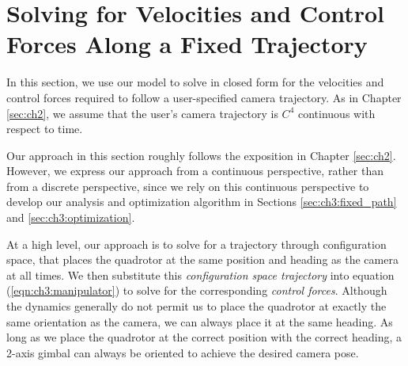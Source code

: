 \section{Solving for Velocities and Control Forces Along a Fixed Trajectory}
\label{sec:ch3:fixed_trajectory}

In this section, we use our model to solve in closed form for the velocities and control forces required to follow a user-specified camera trajectory.
As in Chapter \ref{sec:ch2}, we assume that the user's camera trajectory is $C^4$ continuous with respect to time.

Our approach in this section roughly follows the exposition in Chapter \ref{sec:ch2}.
However, we express our approach from a continuous perspective, rather than from a discrete perspective, since we rely on this continuous perspective to develop our analysis and optimization algorithm in Sections \ref{sec:ch3:fixed_path} and \ref{sec:ch3:optimization}.

At a high level, our approach is to solve for a trajectory through configuration space, that places the quadrotor at the same position and heading as the camera at all times.
We then substitute this \emph{configuration space trajectory} into equation (\ref{eqn:ch3:manipulator}) to solve for the corresponding \emph{control forces}.
Although the dynamics generally do not permit us to place the quadrotor at exactly the same orientation as the camera, we can always place it at the same heading.
As long as we place the quadrotor at the correct position with the correct heading, a 2-axis gimbal can always be oriented to achieve the desired camera pose.


